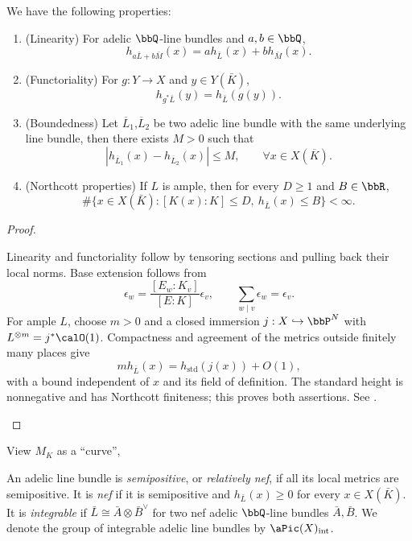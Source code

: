 \begin{proposition}[label=\labelNFM{prop:fundamental-properties-of-heights}, status=draft, tag=0000000]
	We have the following properties:
	\begin{enumerate}
		\item (Linearity) For adelic $\bbQ$-line bundles and $a,b \in \bbQ$,
		      \[ h_{a\bar L+b\bar M}(x) = a h_{\bar L}(x)+b h_{\bar M}(x). \]
		\item (Functoriality) For $g:Y \to X$ and $y \in Y(\bar K)$,
		      \[ h_{g^*\bar L}(y) = h_{\bar L}(g(y)). \]
		\item (Boundedness) Let $\overline{L}_1$,$\overline{L}_2$ be two adelic line bundle with the same underlying line bundle, then there exists $M > 0$ such that
		      \[ | h_{\overline{L}_1}(x) - h_{\overline{L}_2}(x) | \leq M,\qquad \forall x \in X(\overline{K}). \]
		\item (Northcott properties) If $L$ is ample, then for every $D \geq 1$ and $B \in \bbR$,
		      \[ \#\{x \in X(\bar K):[K(x):K] \leq D,\ h_{\bar L}(x) \leq B\} < \infty. \]
	\end{enumerate}
	\Yang{}
\end{proposition}
\begin{proof}
	\leavevmode\par
	\begin{latexmathchange}
		Linearity and functoriality follow by tensoring sections and pulling back their local norms.
		Base extension follows from
		\[ \epsilon_w = \frac{[E_w:K_v]}{[E:K]}\epsilon_v, \qquad \sum_{w\mid v}\epsilon_w = \epsilon_v. \]
		For ample $L$, choose $m > 0$ and a closed immersion $j:X\hookrightarrow\bbP^N$ with $L^{\otimes m} = j^*\calO(1)$.
		Compactness and agreement of the metrics outside finitely many places give
		\[ m h_{\bar L}(x) = h_{\mathrm{std}}(j(x))+O(1), \]
		with a bound independent of $x$ and its field of definition.
		The standard height is nonnegative and has Northcott finiteness; this proves both assertions.
		See \cite[Appendix~A.1]{Yuan-Zhang-2026-AdelicLineBundles}.
	\end{latexmathchange}
\end{proof}

\Yang{}

View $M_K$ as a ``curve'', \Yang{}

\begin{definition}[label=\labelNFM{def:positivity-of-adelic-line-bundles}, status=draft, tag=0000000]
	An adelic line bundle is \emph{semipositive}, or \emph{relatively nef}, if all its local metrics are semipositive.
	It is \emph{nef} if it is semipositive and $h_{\bar L}(x) \geq 0$ for every $x \in X(\bar K)$.
	It is \emph{integrable} if $\bar L \cong \bar A \otimes \bar B^\vee$ for two nef adelic $\bbQ$-line bundles $\bar A,\bar B$.
	We denote the group of integrable adelic line bundles by $\aPic(X)_{\mathrm{int}}$.
\end{definition}


